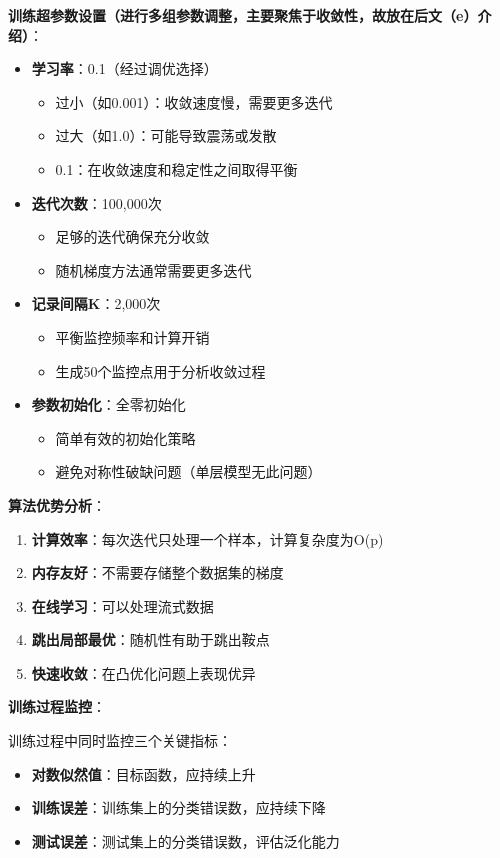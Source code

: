 \documentclass[a4paper]{article}
\begin{document}
\textbf{训练超参数设置（进行多组参数调整，主要聚焦于收敛性，故放在后文（e）介绍）}：
\begin{itemize}
    \item \textbf{学习率}：0.1（经过调优选择）
    \begin{itemize}
        \item 过小（如0.001）：收敛速度慢，需要更多迭代
        \item 过大（如1.0）：可能导致震荡或发散
        \item 0.1：在收敛速度和稳定性之间取得平衡
    \end{itemize}
    \item \textbf{迭代次数}：100,000次
    \begin{itemize}
        \item 足够的迭代确保充分收敛
        \item 随机梯度方法通常需要更多迭代
    \end{itemize}
    \item \textbf{记录间隔K}：2,000次
    \begin{itemize}
        \item 平衡监控频率和计算开销
        \item 生成50个监控点用于分析收敛过程
    \end{itemize}
    \item \textbf{参数初始化}：全零初始化
    \begin{itemize}
        \item 简单有效的初始化策略
        \item 避免对称性破缺问题（单层模型无此问题）
    \end{itemize}
\end{itemize}

\textbf{算法优势分析}：
\begin{enumerate}
    \item \textbf{计算效率}：每次迭代只处理一个样本，计算复杂度为O(p)
    \item \textbf{内存友好}：不需要存储整个数据集的梯度
    \item \textbf{在线学习}：可以处理流式数据
    \item \textbf{跳出局部最优}：随机性有助于跳出鞍点
    \item \textbf{快速收敛}：在凸优化问题上表现优异
\end{enumerate}

\textbf{训练过程监控}：

训练过程中同时监控三个关键指标：
\begin{itemize}
    \item \textbf{对数似然值}：目标函数，应持续上升
    \item \textbf{训练误差}：训练集上的分类错误数，应持续下降
    \item \textbf{测试误差}：测试集上的分类错误数，评估泛化能力
\end{itemize}
\end{document}
